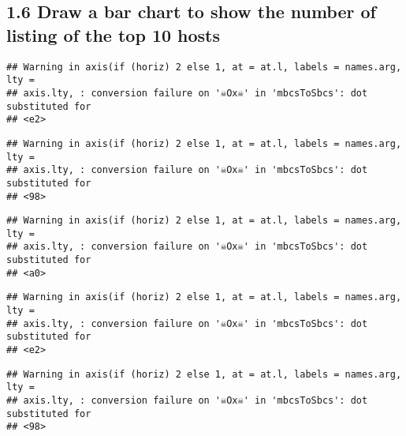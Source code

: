 \documentclass[
]{article}
\newenvironment{Shaded}{\begin{snugshade}}{\end{snugshade}}
\newcommand{\AttributeTok}[1]{\textcolor[rgb]{0.77,0.63,0.00}{#1}}
\newcommand{\FunctionTok}[1]{\textcolor[rgb]{0.00,0.00,0.00}{#1}}
\newcommand{\NormalTok}[1]{#1}
\newcommand{\OtherTok}[1]{\textcolor[rgb]{0.56,0.35,0.01}{#1}}
\newcommand{\SpecialCharTok}[1]{\textcolor[rgb]{0.00,0.00,0.00}{#1}}
\newcommand{\StringTok}[1]{\textcolor[rgb]{0.31,0.60,0.02}{#1}}
\begin{document}
\hypertarget{draw-a-bar-chart-to-show-the-number-of-listing-of-the-top-10-hosts}{%
\subsection{1.6 Draw a bar chart to show the number of listing of the
top 10
hosts}\label{draw-a-bar-chart-to-show-the-number-of-listing-of-the-top-10-hosts}}

\begin{Shaded}
\end{Shaded}

\begin{verbatim}
## Warning in axis(if (horiz) 2 else 1, at = at.l, labels = names.arg, lty =
## axis.lty, : conversion failure on '☠Ox☠' in 'mbcsToSbcs': dot substituted for
## <e2>
\end{verbatim}

\begin{verbatim}
## Warning in axis(if (horiz) 2 else 1, at = at.l, labels = names.arg, lty =
## axis.lty, : conversion failure on '☠Ox☠' in 'mbcsToSbcs': dot substituted for
## <98>
\end{verbatim}

\begin{verbatim}
## Warning in axis(if (horiz) 2 else 1, at = at.l, labels = names.arg, lty =
## axis.lty, : conversion failure on '☠Ox☠' in 'mbcsToSbcs': dot substituted for
## <a0>
\end{verbatim}

\begin{verbatim}
## Warning in axis(if (horiz) 2 else 1, at = at.l, labels = names.arg, lty =
## axis.lty, : conversion failure on '☠Ox☠' in 'mbcsToSbcs': dot substituted for
## <e2>
\end{verbatim}

\begin{verbatim}
## Warning in axis(if (horiz) 2 else 1, at = at.l, labels = names.arg, lty =
## axis.lty, : conversion failure on '☠Ox☠' in 'mbcsToSbcs': dot substituted for
## <98>
\end{verbatim}
\end{document}
